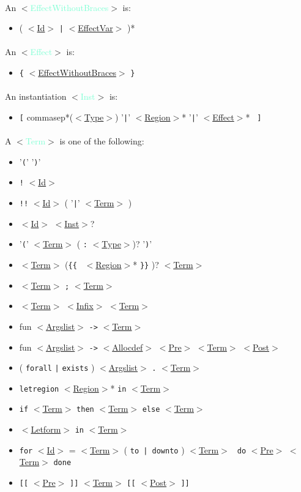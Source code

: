 \documentclass[a4paper]{scrreprt}
\newcommand{\cat}[1]{$<$\hyperref[#1]{#1}$>$}
\newcommand{\likecat}[1]{$<$\textcolor{Aquamarine}{#1}$>$}
\newcommand{\catdef}[1]{\label{#1}\likecat{#1}}
\begin{document}
\paragraph{}
An \catdef{EffectWithoutBraces} is: 
\begin{itemize}
  \item ( \cat{Id} {\tt |} \cat{EffectVar} )*
\end{itemize}

\paragraph{}
An \catdef{Effect} is: 
\begin{itemize}
  \item {\tt \{} \cat{EffectWithoutBraces} {\tt \}}
\end{itemize}

\paragraph{}
An instantiation \catdef{Inst} is:
\begin{itemize}
  \item {\tt [} commasep*(\cat{Type}) '{\tt |}' \cat{Region}* '{\tt |}' \cat{Effect}* {\tt
    ]}
\end{itemize}
  
\paragraph{}
A \catdef{Term} is one of the following:
\begin{itemize}
  \item '{\tt (}' '{\tt )}'
  \item {\tt !} \cat{Id}
  \item {\tt !!} \cat{Id} ( '{\tt |}' \cat{Term} )
  \item \cat{Id} \cat{Inst}?
  \item '{\tt (}' \cat{Term} ( {\tt :} \cat{Type})? '{\tt )}'
  \item \cat{Term} ({\tt \{\{ } \cat{Region}* {\tt \}\}} )? \cat{Term} 
  \item \cat{Term} {\tt ;} \cat{Term} 
  \item \cat{Term} \cat{Infix} \cat{Term}
  \item fun \cat{Argslist} {\tt ->} \cat{Term}
  \item fun \cat{Argslist} {\tt ->} \cat{Allocdef} {\cat{Pre}} \cat{Term} {\cat{Post}}
  \item ( {\tt forall} {\tt |} {\tt exists} ) \cat{Argslist} {\tt .} \cat{Term}
  \item {\tt letregion} \cat{Region}* {\tt in} \cat{Term}
  \item {\tt if} \cat{Term} {\tt then} \cat{Term} {\tt else} \cat{Term}
  \item \cat{Letform} {\tt in} \cat{Term}
  \item {\tt for} \cat{Id} = \cat{Term} ( {\tt to | downto} ) \cat{Term} {\tt
    do} {\cat{Pre}} \cat{Term} {\tt done}
  \item {\tt [[} \cat{Pre} {\tt ]]} \cat{Term} {\tt [[} \cat{Post} {\tt ]]}
\end{itemize}
\end{document}
